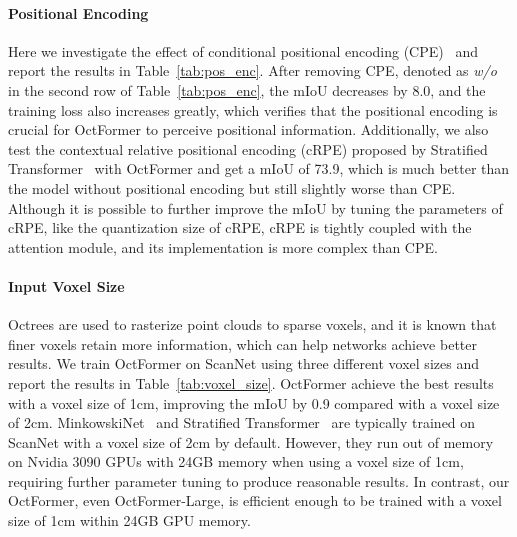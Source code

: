 \documentclass[acmtog,screen,authorversion]{acmart}
\begin{document}
\paragraph{Positional Encoding}
Here we investigate the effect of conditional positional encoding (CPE)~\cite{Chu2021} and report the results in Table~\ref{tab:pos_enc}.
After removing CPE, denoted as \emph{w/o} in the second row of Table~\ref{tab:pos_enc}, the mIoU decreases by 8.0, and the training loss also increases greatly, which verifies that the positional encoding is crucial for OctFormer to perceive positional information.
Additionally, we also test the contextual relative positional encoding (cRPE) proposed by Stratified Transformer~\cite{Lai2022} with OctFormer and get a mIoU of 73.9, which is much better than the model without positional encoding but still slightly worse than CPE.
Although it is possible to further improve the mIoU by tuning the parameters of cRPE, like the quantization size of cRPE, cRPE is tightly coupled with the attention module, and its implementation is more complex than CPE.


\paragraph{Input Voxel Size}
Octrees are used to rasterize point clouds to sparse voxels, and it is known that finer voxels retain more information, which can help networks achieve better results.
We train OctFormer on ScanNet using three different voxel sizes and report the results in Table~\ref{tab:voxel_size}.
OctFormer achieve the best results with a voxel size of 1cm, improving the mIoU by 0.9 compared with a voxel size of 2cm.
MinkowskiNet~\cite{Choy2019} and Stratified Transformer~\cite{Lai2022} are typically trained on ScanNet with a voxel size of 2cm by default.
However, they run out of memory on Nvidia 3090 GPUs with 24GB memory when using a voxel size of 1cm, requiring further parameter tuning to produce reasonable results.
In contrast, our OctFormer, even OctFormer-Large, is efficient enough to be trained with a voxel size of 1cm within 24GB GPU memory.
\end{document}
